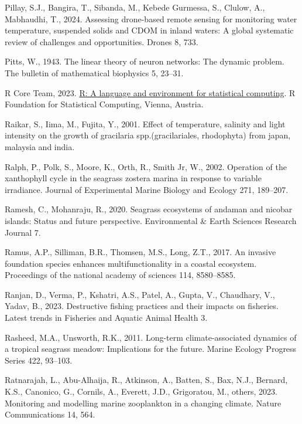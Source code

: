 \documentclass[
  letterpaper,
  11pt,
  english,
  singlespacing,
  headsepline]{MastersDoctoralThesis}
\newlength{\cslhangindent}
\newenvironment{CSLReferences}[2] %
 {\begin{list}{}{%
  \setlength{\itemindent}{0pt}
  \setlength{\leftmargin}{0pt}
  \setlength{\parsep}{0pt}
  \ifodd #1
   \setlength{\leftmargin}{\cslhangindent}
   \setlength{\itemindent}{-1\cslhangindent}
  \fi
  \setlength{\itemsep}{#2\baselineskip}}}
 {\end{list}}
\begin{document}
\begin{CSLReferences}{1}{0}
Pillay, S.J., Bangira, T., Sibanda, M., Kebede Gurmessa, S., Clulow, A.,
Mabhaudhi, T., 2024. Assessing drone-based remote sensing for monitoring
water temperature, suspended solids and CDOM in inland waters: A global
systematic review of challenges and opportunities. Drones 8, 733.

Pitts, W., 1943. The linear theory of neuron networks: The dynamic
problem. The bulletin of mathematical biophysics 5, 23--31.

R Core Team, 2023. \href{https://www.R-project.org/}{R: A language and
environment for statistical computing}. R Foundation for Statistical
Computing, Vienna, Austria.

Raikar, S., Iima, M., Fujita, Y., 2001. Effect of temperature, salinity
and light intensity on the growth of gracilaria spp.(gracilariales,
rhodophyta) from japan, malaysia and india.

Ralph, P., Polk, S., Moore, K., Orth, R., Smith Jr, W., 2002. Operation
of the xanthophyll cycle in the seagrass zostera marina in response to
variable irradiance. Journal of Experimental Marine Biology and Ecology
271, 189--207.

Ramesh, C., Mohanraju, R., 2020. Seagrass ecosystems of andaman and
nicobar islands: Status and future perspective. Environmental \& Earth
Sciences Research Journal 7.

Ramus, A.P., Silliman, B.R., Thomsen, M.S., Long, Z.T., 2017. An
invasive foundation species enhances multifunctionality in a coastal
ecosystem. Proceedings of the national academy of sciences 114,
8580--8585.

Ranjan, D., Verma, P., Kshatri, A.S., Patel, A., Gupta, V., Chaudhary,
V., Yadav, B., 2023. Destructive fishing practices and their impacts on
fisheries. Latest trends in Fisheries and Aquatic Animal Health 3.

Rasheed, M.A., Unsworth, R.K., 2011. Long-term climate-associated
dynamics of a tropical seagrass meadow: Implications for the future.
Marine Ecology Progress Series 422, 93--103.

Ratnarajah, L., Abu-Alhaija, R., Atkinson, A., Batten, S., Bax, N.J.,
Bernard, K.S., Canonico, G., Cornils, A., Everett, J.D., Grigoratou, M.,
others, 2023. Monitoring and modelling marine zooplankton in a changing
climate. Nature Communications 14, 564.


\end{CSLReferences}
\end{document}
